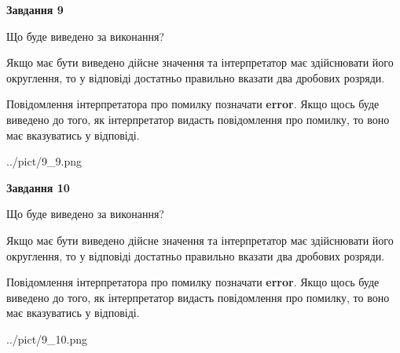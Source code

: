 \documentclass[12pt, ukrainian]{article}
\begin{document}
{\begin {Large}
{\begin {center}\textbf{Завдання 9}\end {center}}\par
Що буде виведено за виконання? \par

Якщо має бути виведено дійсне значення та інтерпретатор має здійснювати його округлення, 
то у відповіді достатньо правильно вказати два дробових розряди.

Повідомлення інтерпретатора про помилку позначати \textbf{error}.
Якщо щось буде виведено до того, як інтерпретатор видасть повідомлення про помилку, 
то воно має вказуватись у відповіді. \par

\begin{center}
	{../pict/9_9.png}
\end{center}
\newpage

{\begin {center}\textbf{Завдання 10}\end {center}}\par
Що буде виведено за виконання? \par

Якщо має бути виведено дійсне значення та інтерпретатор має здійснювати його округлення, 
то у відповіді достатньо правильно вказати два дробових розряди.

Повідомлення інтерпретатора про помилку позначати \textbf{error}.
Якщо щось буде виведено до того, як інтерпретатор видасть повідомлення про помилку, 
то воно має вказуватись у відповіді. \par

\begin{center}
	{../pict/9_10.png}
\end{center}
\newpage

\end {Large}}
\end{document}
